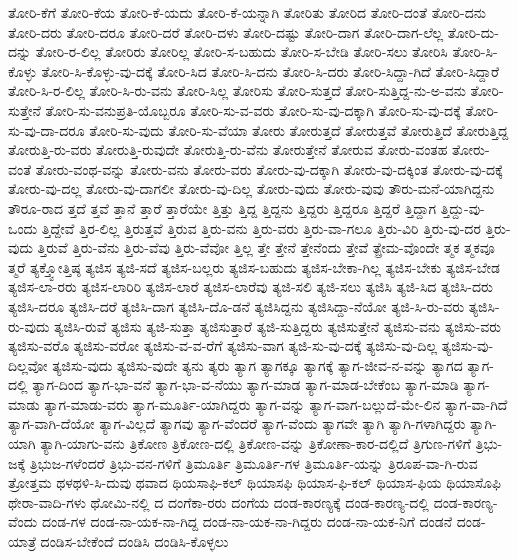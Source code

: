 {ತೋರಿ-ಕೆಗೆ
ತೋರಿ-ಕೆಯ
ತೋರಿ-ಕೆ-ಯದು
ತೋರಿ-ಕೆ-ಯನ್ನಾಗಿ
ತೋರಿತು
ತೋರಿದ
ತೋರಿ-ದಂತೆ
ತೋರಿ-ದನು
ತೋರಿ-ದರು
ತೋರಿ-ದರೂ
ತೋರಿ-ದರೆ
ತೋರಿ-ದಳು
ತೋರಿ-ದಷ್ಟು
ತೋರಿ-ದಾಗ
ತೋರಿ-ದಾಗ-ಲೆಲ್ಲ
ತೋರಿ-ದು-ದನ್ನು
ತೋರಿ-ರ-ಲಿಲ್ಲ
ತೋರಿರು
ತೋರಿಲ್ಲ
ತೋರಿ-ಸ-ಬಹುದು
ತೋರಿ-ಸ-ಬೇಡಿ
ತೋರಿ-ಸಲು
ತೋರಿಸಿ
ತೋರಿ-ಸಿ-ಕೊಳ್ಳು
ತೋರಿ-ಸಿ-ಕೊಳ್ಳು-ವು-ದಕ್ಕೆ
ತೋರಿ-ಸಿದ
ತೋರಿ-ಸಿ-ದನು
ತೋರಿ-ಸಿ-ದರು
ತೋರಿ-ಸಿದ್ದಾ-ಗಿದೆ
ತೋರಿ-ಸಿದ್ದಾರೆ
ತೋರಿ-ಸಿ-ರ-ಲಿಲ್ಲ
ತೋರಿ-ಸಿ-ರು-ವನು
ತೋರಿ-ಸಿಲ್ಲ
ತೋರಿಸು
ತೋರಿ-ಸುತ್ತದೆ
ತೋರಿ-ಸುತ್ತಿದ್ದ-ನು-ಅ-ವನು
ತೋರಿ-ಸುತ್ತೇನೆ
ತೋರಿ-ಸು-ವನುಪ್ರತಿ-ಯೊಬ್ಬರೂ
ತೋರಿ-ಸು-ವ-ವರು
ತೋರಿ-ಸು-ವು-ದಕ್ಕಾಗಿ
ತೋರಿ-ಸು-ವು-ದಕ್ಕೆ
ತೋರಿ-ಸು-ವು-ದಾ-ದರೂ
ತೋರಿ-ಸು-ವುದು
ತೋರಿ-ಸು-ವೆಯಾ
ತೋರು
ತೋರುತ್ತದೆ
ತೋರುತ್ತವೆ
ತೋರುತ್ತಿದೆ
ತೋರುತ್ತಿದ್ದ
ತೋರುತ್ತಿ-ರು-ವರು
ತೋರುತ್ತಿ-ರುವುದೇ
ತೋರುತ್ತಿ-ರು-ವೆನು
ತೋರುತ್ತೇನೆ
ತೋರುವ
ತೋರು-ವಂತಹ
ತೋರು-ವಂತೆ
ತೋರು-ವಂಥ-ವನ್ನು
ತೋರು-ವನು
ತೋರು-ವರು
ತೋರು-ವು-ದಕ್ಕಾಗಿ
ತೋರು-ವು-ದಕ್ಕಿಂತ
ತೋರು-ವು-ದಕ್ಕೆ
ತೋರು-ವು-ದಲ್ಲ
ತೋರು-ವು-ದಾಗಲೀ
ತೋರು-ವು-ದಿಲ್ಲ
ತೋರು-ವುದು
ತೋರು-ವುವು
ತೌರು-ಮನೆ-ಯಾಗಿದ್ದನು
ತೌರೂ-ರಾದ
ತ್ತದೆ
ತ್ತವೆ
ತ್ತಾನೆ
ತ್ತಾರೆ
ತ್ತಾರೆಯೇ
ತ್ತಿತ್ತು
ತ್ತಿದ್ದ
ತ್ತಿದ್ದನು
ತ್ತಿದ್ದರು
ತ್ತಿದ್ದರೂ
ತ್ತಿದ್ದರೆ
ತ್ತಿದ್ದಾಗ
ತ್ತಿದ್ದು-ವು-ಒಂದು
ತ್ತಿದ್ದೇವೆ
ತ್ತಿರ-ಲಿಲ್ಲ
ತ್ತಿರುತ್ತವೆ
ತ್ತಿರುವ
ತ್ತಿರು-ವನು
ತ್ತಿರು-ವರು
ತ್ತಿರು-ವಾ-ಗಲೂ
ತ್ತಿರು-ವಿರಿ
ತ್ತಿರು-ವು-ದರ
ತ್ತಿರು-ವುದು
ತ್ತಿರುವೆ
ತ್ತಿರು-ವೆನು
ತ್ತಿರು-ವೆವು
ತ್ತಿರು-ವೆವೋ
ತ್ತಿಲ್ಲ
ತ್ತೇ
ತ್ತೇನೆ
ತ್ತೇನೆಂದು
ತ್ತೇವೆ
ತ್ಪ್ರೇಮ-ವೊಂದೇ
ತ್ಮಕ
ತ್ಮಕವೂ
ತ್ಮರೆ
ತ್ಯಕ್ತ್ವೋತ್ತಿಷ್ಠ
ತ್ಯಜಿಸ
ತ್ಯಜಿ-ಸದೆ
ತ್ಯಜಿಸ-ಬಲ್ಲರು
ತ್ಯಜಿಸ-ಬಹುದು
ತ್ಯಜಿಸ-ಬೇಕಾ-ಗಿಲ್ಲ
ತ್ಯಜಿಸ-ಬೇಕು
ತ್ಯಜಿಸ-ಬೇಡ
ತ್ಯಜಿಸ-ಲಾ-ರರು
ತ್ಯಜಿಸ-ಲಾರಿರಿ
ತ್ಯಜಿಸ-ಲಾರೆ
ತ್ಯಜಿಸ-ಲಾರೆವು
ತ್ಯಜಿ-ಸಲಿ
ತ್ಯಜಿ-ಸಲು
ತ್ಯಜಿಸಿ
ತ್ಯಜಿ-ಸಿದ
ತ್ಯಜಿಸಿ-ದರು
ತ್ಯಜಿಸಿ-ದರೂ
ತ್ಯಜಿಸಿ-ದರೆ
ತ್ಯಜಿಸಿ-ದಾಗ
ತ್ಯಜಿಸಿ-ದೊ-ಡನೆ
ತ್ಯಜಿಸಿದ್ದನು
ತ್ಯಜಿಸಿದ್ದಾ-ನೆಯೋ
ತ್ಯಜಿ-ಸಿ-ರು-ವರು
ತ್ಯಜಿಸಿ-ರು-ವುದು
ತ್ಯಜಿಸಿ-ರುವೆ
ತ್ಯಜಿಸು
ತ್ಯಜಿ-ಸುತ್ತಾ
ತ್ಯಜಿಸುತ್ತಾರೆ
ತ್ಯಜಿ-ಸುತ್ತಿದ್ದರು
ತ್ಯಜಿಸುತ್ತೇನೆ
ತ್ಯಜಿಸು-ವನು
ತ್ಯಜಿಸು-ವರು
ತ್ಯಜಿಸು-ವರೊ
ತ್ಯಜಿಸು-ವರೋ
ತ್ಯಜಿಸು-ವ-ವ-ರೆಗೆ
ತ್ಯಜಿಸು-ವಾಗ
ತ್ಯಜಿ-ಸು-ವು-ದಕ್ಕೆ
ತ್ಯಜಿಸು-ವು-ದಿಲ್ಲ
ತ್ಯಜಿಸು-ವು-ದಿಲ್ಲವೋ
ತ್ಯಜಿಸು-ವುದು
ತ್ಯಜಿಸು-ವುದೇ
ತ್ಯನು
ತ್ಯರು
ತ್ಯಾಗ
ತ್ಯಾಗಕ್ಕೂ
ತ್ಯಾಗಕ್ಕೆ
ತ್ಯಾಗ-ಜೀವ-ನ-ವನ್ನು
ತ್ಯಾಗದ
ತ್ಯಾಗ-ದಲ್ಲಿ
ತ್ಯಾಗ-ದಿಂದ
ತ್ಯಾಗ-ಭಾ-ವನೆ
ತ್ಯಾಗ-ಭಾ-ವ-ನೆಯು
ತ್ಯಾಗ-ಮಾಡ
ತ್ಯಾಗ-ಮಾಡ-ಬೇಕೆಂಬ
ತ್ಯಾಗ-ಮಾಡಿ
ತ್ಯಾಗ-ಮಾಡು
ತ್ಯಾಗ-ಮಾಡು-ವರು
ತ್ಯಾಗ-ಮೂರ್ತಿ-ಯಾಗಿದ್ದರು
ತ್ಯಾಗ-ವನ್ನು
ತ್ಯಾಗ-ವಾಗ-ಬಲ್ಲುದೆ-ಮೇ-ಲಿನ
ತ್ಯಾಗ-ವಾ-ಗಿದೆ
ತ್ಯಾಗ-ವಾಗಿ-ದೆಯೋ
ತ್ಯಾಗ-ವಿಲ್ಲದೆ
ತ್ಯಾಗವು
ತ್ಯಾಗ-ವೆಂದರೆ
ತ್ಯಾಗ-ವೆಂದು
ತ್ಯಾಗವೇ
ತ್ಯಾಗಿ
ತ್ಯಾಗಿ-ಗಳಾಗಿದ್ದರು
ತ್ಯಾಗಿ-ಯಾಗಿ
ತ್ಯಾಗಿ-ಯಾಗು-ವನು
ತ್ರಿಕೋಣ
ತ್ರಿಕೋಣ-ದಲ್ಲಿ
ತ್ರಿಕೋಣ-ವನ್ನು
ತ್ರಿಕೋಣಾ-ಕಾರ-ದಲ್ಲಿದೆ
ತ್ರಿಗುಣ-ಗಳಿಗೆ
ತ್ರಿಭು-ಜಕ್ಕೆ
ತ್ರಿಭುಜ-ಗಳೆಂದರೆ
ತ್ರಿಭು-ವನ-ಗಳಿಗೆ
ತ್ರಿಮೂರ್ತಿ
ತ್ರಿಮೂರ್ತಿ-ಗಳ
ತ್ರಿಮೂರ್ತಿ-ಯನ್ನು
ತ್ರಿರೂಪ-ವಾ-ಗಿ-ರುವ
ತ್ರೋತ್ತಮ
ಥಳಥಳಿ-ಸಿ-ದುವು
ಥವಾದ
ಥಿಯಸಾಫಿ-ಕಲ್
ಥಿಯಾಸಫಿ
ಥಿಯಾಸ-ಫಿ-ಕಲ್
ಥಿಯಾಸ-ಫಿಯ
ಥಿಯಾಸೊಫಿ
ಥೇರಾ-ವಾದಿ-ಗಳು
ಥೋಮಿ-ನಲ್ಲಿ
ದ
ದಂಗೆಕಾ-ರರು
ದಂಗೆಯ
ದಂಡ-ಕಾರಣ್ಯಕ್ಕೆ
ದಂಡ-ಕಾರಣ್ಯ-ದಲ್ಲಿ
ದಂಡ-ಕಾರಣ್ಯ-ವೆಂದು
ದಂಡ-ಗಳ
ದಂಡ-ನಾ-ಯಕ-ನಾ-ಗಿದ್ದ
ದಂಡ-ನಾ-ಯಕ-ನಾ-ಗಿದ್ದರು
ದಂಡ-ನಾ-ಯಕ-ನಿಗೆ
ದಂಡನೆ
ದಂಡ-ಯಾತ್ರೆ
ದಂಡಿಸ-ಬೇಕೆಂದೆ
ದಂಡಿಸಿ
ದಂಡಿಸಿ-ಕೊಳ್ಳಲು
}
